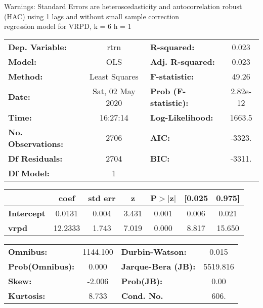 Warnings: \newline
 [1] Standard Errors are heteroscedasticity and autocorrelation robust (HAC) using 1 lags and without small sample correction\\ 

regression model for VRPD, k = 6 h = 1\begin{center}
\begin{tabular}{lclc}
\toprule
\textbf{Dep. Variable:}    &       rtrn       & \textbf{  R-squared:         } &     0.023   \\
\textbf{Model:}            &       OLS        & \textbf{  Adj. R-squared:    } &     0.023   \\
\textbf{Method:}           &  Least Squares   & \textbf{  F-statistic:       } &     49.26   \\
\textbf{Date:}             & Sat, 02 May 2020 & \textbf{  Prob (F-statistic):} &  2.82e-12   \\
\textbf{Time:}             &     16:27:14     & \textbf{  Log-Likelihood:    } &    1663.5   \\
\textbf{No. Observations:} &        2706      & \textbf{  AIC:               } &    -3323.   \\
\textbf{Df Residuals:}     &        2704      & \textbf{  BIC:               } &    -3311.   \\
\textbf{Df Model:}         &           1      & \textbf{                     } &             \\
\bottomrule
\end{tabular}
\begin{tabular}{lcccccc}
                   & \textbf{coef} & \textbf{std err} & \textbf{z} & \textbf{P$> |$z$|$} & \textbf{[0.025} & \textbf{0.975]}  \\
\midrule
\textbf{Intercept} &       0.0131  &        0.004     &     3.431  &         0.001        &        0.006    &        0.021     \\
\textbf{vrpd}      &      12.2333  &        1.743     &     7.019  &         0.000        &        8.817    &       15.650     \\
\bottomrule
\end{tabular}
\begin{tabular}{lclc}
\textbf{Omnibus:}       & 1144.100 & \textbf{  Durbin-Watson:     } &    0.015  \\
\textbf{Prob(Omnibus):} &   0.000  & \textbf{  Jarque-Bera (JB):  } & 5519.816  \\
\textbf{Skew:}          &  -2.006  & \textbf{  Prob(JB):          } &     0.00  \\
\textbf{Kurtosis:}      &   8.733  & \textbf{  Cond. No.          } &     606.  \\
\bottomrule
\end{tabular}
\end{center}


